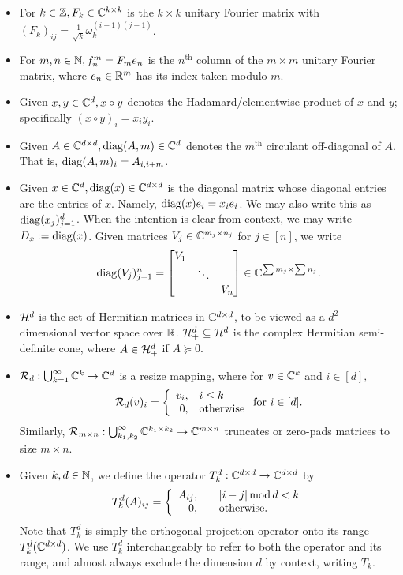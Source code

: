 \begin{itemize}
\item For $k \in \mathbb{Z}, F_k \in \mathbb{C}^{k \times k}$ is the $k \times k$ unitary Fourier matrix with $(F_k)_{ij} = \frac{1}{\sqrt{k}} \omega_k^{(i-1)(j-1)}$.
  \item For $m, n \in \mathbb{N}, f_n^m = F_m e_n$ is the $n^{\text{th}}$ column of the $m \times m$ unitary Fourier matrix, where $e_n \in \mathbb{R}^m$ has its index taken modulo $m$.
\item Given $x, y \in \mathbb{C}^d, x \circ y$ denotes the Hadamard/elementwise product of $x$ and $y$; specifically $(x \circ y)_i = x_i y_i$.
\item Given $A \in \mathbb{C}^{d \times d}, \operatorname{diag}(A, m) \in \mathbb{C}^d$ denotes the $m^{\text{th}}$ circulant off-diagonal of $A$.  That is, $\operatorname{diag}(A, m)_i = A_{i, i + m}$.
\item Given $x \in \mathbb{C}^d, \operatorname{diag}(x) \in \mathbb{C}^{d \times d}$ is the diagonal matrix whose diagonal entries are the entries of $x$.  Namely, $\operatorname{diag}(x) e_i = x_i e_i$.  We may also write this as $\operatorname{diag}(x_j)_{j = 1}^d$.  When the intention is clear from context, we may write $D_x := \operatorname{diag}(x)$.  Given matrices $V_j \in \mathbb{C}^{m_j \times n_j}$ for $j \in [n]$, we write \[\operatorname{diag}(V_j)_{j = 1}^n = \begin{bmatrix} V_1 & & \\ & \ddots & \\ & & V_n \end{bmatrix} \in \mathbb{C}^{\sum m_j \times \sum n_j}.\]
  \item $\mathcal{H}^d$ is the set of Hermitian matrices in $\mathbb{C}^{d \times d}$, to be viewed as a $d^2$-dimensional vector space over $\mathbb{R}$.  $\mathcal{H}^d_+ \subseteq \mathcal{H}^d$ is the complex Hermitian semi-definite cone, where $A \in \mathcal{H}^d_+$ if $A \succeq 0$.
  \item $\mathcal{R}_d : \bigcup_{k = 1}^\infty \mathbb{C}^k \to \mathbb{C}^d$ is a resize mapping, where for $v \in \mathbb{C}^k$ and $i \in [d],$ $$\mathcal{R}_d(v)_i = \left\{\begin{array}{r@{,\quad}l} v_i & i \le k \\ 0 & \text{otherwise} \end{array}\right. \text{for}\ i \in [d].$$  Similarly, $\mathcal{R}_{m \times n} : \bigcup_{k_1, k_2}^\infty \mathbb{C}^{k_1 \times k_2} \to \mathbb{C}^{m \times n}$ truncates or zero-pads matrices to size $m \times n.$
  \item Given $k, d \in \mathbb{N}$, we define the operator $T^d_k : \mathbb{C}^{d \times d} \to \mathbb{C}^{d \times d}$ by \[T_k^d(A)_{ij} = \left\{\begin{array}{r@{,\qquad}l} A_{ij} & |i - j| \mod d < k \\ 0 & \text{otherwise}. \end{array}\right.\]  Note that $T^d_k$ is simply the orthogonal projection operator onto its range $T_k^d(\mathbb{C}^{d \times d})$.  We use $T^d_k$ interchangeably to refer to both the operator and its range, and almost always exclude the dimension $d$ by context, writing $T_k$.

\end{itemize}
